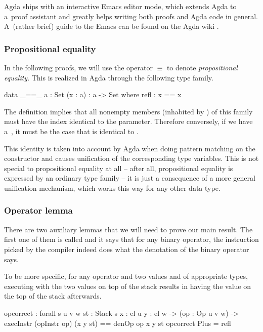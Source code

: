 Agda ships with an interactive Emacs editor mode, which extends Agda to a~proof
assistant and greatly helps writing both proofs and Agda code in general. A~(rather brief) guide
to the Emacs  can be found on the Agda wiki \cite{agda-mode}.

\subsubsection{Propositional equality}

In the following proofs, we will use the operator $\equiv$ to denote
\emph{propositional equality}. This is realized in Agda through the following
type family.

\begin{code}
  data _==_ {a : Set} (x : a) : a -> Set where
    refl : x == x
\end{code}

\noindent The definition implies that all nonempty members (inhabited by ) of this
family must have the index identical to the parameter.
Therefore conversely, if we have a~, it must be the case that 
is identical to .

This identity is taken into account by Agda when doing pattern matching on the constructor
 and causes unification of the corresponding type variables. This is not special
to propositional equality at all -- after all, propositional equality is expressed by
an ordinary type family -- it is just a consequence of a more general unification mechanism,
which works this way for any other data type.

\subsubsection{Operator lemma}

There are two auxiliary lemmas that we will need to prove our main result. The
first one of them is called  and it says that for any binary
operator, the instruction picked by the compiler indeed does what the
denotation of the binary operator says.

To be more specific, for any operator  and two values  and
 of appropriate types, executing  with the two
values on top of the stack results in having the value 
on the top of the stack afterwards.

\label{sec:cor-op-correct}\begin{code}
  op\-correct : forall {s u v w} {st : Stack s} {x : el u} {y : el w}
    -> (op : Op u v w)
    -> execInstr (opInstr op) (x \scons y \scons st) == denOp op x y \scons st
  op\-correct Plus = refl
\end{code}

